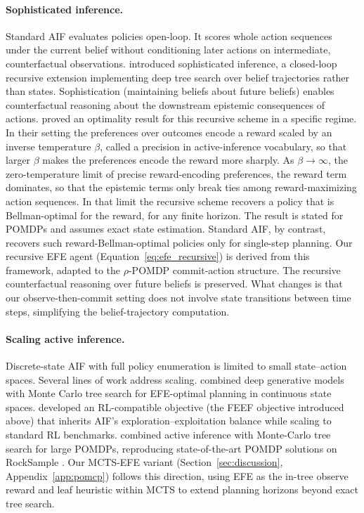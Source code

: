 \paragraph{Sophisticated inference.}
Standard AIF evaluates policies open-loop. It scores whole action sequences under the current belief without conditioning later actions on intermediate, counterfactual observations. \citet{friston2021} introduced sophisticated inference, a closed-loop recursive extension implementing deep tree search over belief trajectories rather than states. Sophistication (maintaining beliefs about future beliefs) enables counterfactual reasoning about the downstream epistemic consequences of actions. \citet{dacosta2020b} proved an optimality result for this recursive scheme in a specific regime. In their setting the preferences over outcomes encode a reward scaled by an inverse temperature $\beta$, called a precision in active-inference vocabulary, so that larger $\beta$ makes the preferences encode the reward more sharply. As $\beta \to \infty$, the zero-temperature limit of precise reward-encoding preferences, the reward term dominates, so that the epistemic terms only break ties among reward-maximizing action sequences. In that limit the recursive scheme recovers a policy that is Bellman-optimal for the reward, for any finite horizon. The result is stated for POMDPs and assumes exact state estimation. Standard AIF, by contrast, recovers such reward-Bellman-optimal policies only for single-step planning. Our recursive EFE agent (Equation~\ref{eq:efe_recursive}) is derived from this framework, adapted to the $\rho$-POMDP commit-action structure. The recursive counterfactual reasoning over future beliefs is preserved. What changes is that our observe-then-commit setting does not involve state transitions between time steps, simplifying the belief-trajectory computation.

\paragraph{Scaling active inference.}
Discrete-state AIF with full policy enumeration is limited to small state--action spaces. Several lines of work address scaling. \citet{fountas2020} combined deep generative models with Monte Carlo tree search for EFE-optimal planning in continuous state spaces. \citet{tschantz2020} developed an RL-compatible objective (the FEEF objective introduced above) that inherits AIF's exploration--exploitation balance while scaling to standard RL benchmarks. \citet{maisto2025} combined active inference with Monte-Carlo tree search for large POMDPs, reproducing state-of-the-art POMDP solutions on RockSample \citep{smith2004}. Our MCTS-EFE variant (Section~\ref{sec:discussion}, Appendix~\ref{app:pomcp}) follows this direction, using EFE as the in-tree observe reward and leaf heuristic within MCTS to extend planning horizons beyond exact tree search.

